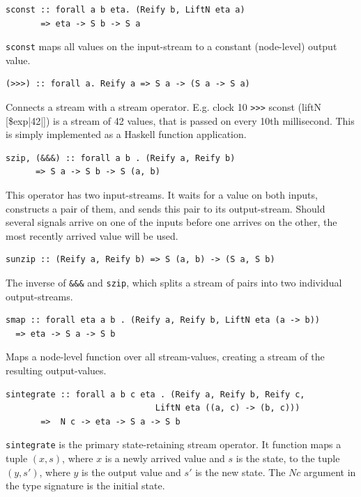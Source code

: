 \documentclass[a4paper, oneside, final]{memoir}
\begin{document}
\begin{description}
\item
\begin{verbatim}
sconst :: forall a b eta. (Reify b, LiftN eta a)
       => eta -> S b -> S a
\end{verbatim}
  \texttt{sconst} maps all values on the input-stream to a constant (node-level) output value.

\item
\begin{verbatim}
(>>>) :: forall a. Reify a => S a -> (S a -> S a)
\end{verbatim}
  Connects a stream with a stream operator.  E.g. {\ttfamily clock 10 \verb|>>>|
    sconst (liftN [\$exp|42|])} is a stream of 42 values, that is passed on
  every 10th millisecond. This is simply implemented as a Haskell function
  application.


\item 
\label{item:szip}
\begin{verbatim}
szip, (&&&) :: forall a b . (Reify a, Reify b)
      => S a -> S b -> S (a, b)
\end{verbatim}
  This operator has two input-streams. It waits for a value on both
  inputs, constructs a pair of them, and sends this pair to its
  output-stream.  Should several signals arrive on one of the inputs
  before one arrives on the other, the most recently arrived value
  will be used.

\item 
\begin{verbatim}
sunzip :: (Reify a, Reify b) => S (a, b) -> (S a, S b)
\end{verbatim}
  The inverse of \texttt{\&\&\&} and \texttt{szip}, which splits a
  stream of pairs into two individual output-streams.

\item 
\begin{verbatim}
smap :: forall eta a b . (Reify a, Reify b, LiftN eta (a -> b))
  => eta -> S a -> S b
\end{verbatim}
  Maps a node-level function over all stream-values, creating a stream
  of the resulting output-values.

\item
\begin{verbatim}
sintegrate :: forall a b c eta . (Reify a, Reify b, Reify c,
                              LiftN eta ((a, c) -> (b, c)))
       =>  N c -> eta -> S a -> S b
\end{verbatim}
  \texttt{sintegrate} is the primary state-retaining stream operator.
  It function maps a tuple $(x, s)$, where $x$ is a newly arrived
  value and $s$ is the state, to the tuple $(y, s')$, where $y$ is the
  output value and $s'$ is the new state.  The $N c$ argument in the
  type signature is the initial state.


\end{description}
\end{document}
